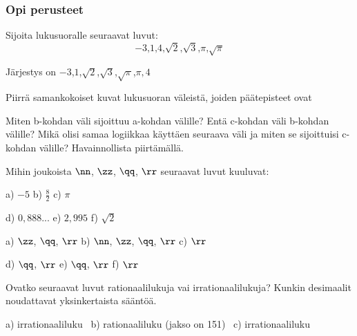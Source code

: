 \begin{tehtavasivu}

\subsubsection*{Opi perusteet}
\begin{tehtava}%
Sijoita lukusuoralle seuraavat luvut:
\[
\mbox{$-3$,$1$,$4$,$\sqrt{2}$,$\sqrt{3}$,$\pi$,$\sqrt{\pi}$}
\]
\begin{vastaus}
Järjestys on \mbox{$-3$,$1$,$\sqrt{2}$,$\sqrt{3}$,$\sqrt{\pi}$,$\pi,4$}
\end{vastaus}
\end{tehtava}

\begin{tehtava} %
Piirrä samankokoiset kuvat lukusuoran väleistä, joiden päätepisteet ovat 
\begin{alakohdat}
\end{alakohdat}
Miten b-kohdan väli sijoittuu a-kohdan välille? Entä c-kohdan väli b-kohdan välille? Mikä olisi samaa logiikkaa käyttäen seuraava väli ja miten se sijoittuisi c-kohdan välille? Havainnollista piirtämällä.
\begin{vastaus}
\begin{alakohdat}
\alakohta{}
\alakohta{}
\alakohta{}
\end{alakohdat}
\end{vastaus}
\end{tehtava}


\begin{tehtava}
Mihin joukoista $\nn$, $\zz$, $\qq$, $\rr$ seuraavat luvut kuuluvat:

a) $-5$ \qquad b) $\frac82$ \qquad c) $\pi$

d) $0,888...$ \qquad e) $2,995$ \qquad f) $\sqrt{2}$

\begin{vastaus}
a) $\zz$, $\qq$, $\rr$ \qquad b) $\nn$, $\zz$, $\qq$, $\rr$ \qquad c) $\rr$

d) $\qq$, $\rr$ \qquad e) $\qq$, $\rr$ \qquad f) $\rr$
\end{vastaus}
\end{tehtava}

\begin{tehtava}
Ovatko seuraavat luvut rationaalilukuja vai irrationaalilukuja? Kunkin desimaalit
noudattavat yksinkertaista sääntöä.
\begin{alakohdat}
\end{alakohdat}
\begin{vastaus}
a) irrationaaliluku \ b) rationaaliluku (jakso on 151) \ c) irrationaaliluku
\end{vastaus}
\end{tehtava}


\end{tehtavasivu}
